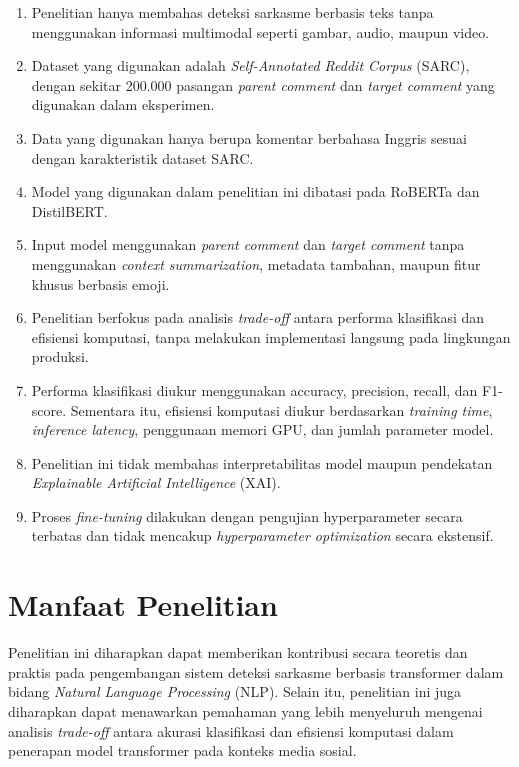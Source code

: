 \begin{enumerate}
    \item Penelitian hanya membahas deteksi sarkasme berbasis teks tanpa menggunakan informasi multimodal seperti gambar, audio, maupun video.
    \item Dataset yang digunakan adalah \textit{Self-Annotated Reddit Corpus} (SARC), dengan sekitar 200.000 pasangan \textit{parent comment} dan \textit{target comment} yang digunakan dalam eksperimen.
    \item Data yang digunakan hanya berupa komentar berbahasa Inggris sesuai dengan karakteristik dataset SARC.
    \item Model yang digunakan dalam penelitian ini dibatasi pada RoBERTa dan DistilBERT.
    \item Input model menggunakan \textit{parent comment} dan \textit{target comment} tanpa menggunakan \textit{context summarization}, metadata tambahan, maupun fitur khusus berbasis emoji.
    \item Penelitian berfokus pada analisis \textit{trade-off} antara performa klasifikasi dan efisiensi komputasi, tanpa melakukan implementasi langsung pada lingkungan produksi.
    \item Performa klasifikasi diukur menggunakan accuracy, precision, recall, dan F1-score. Sementara itu, efisiensi komputasi diukur berdasarkan \textit{training time}, \textit{inference latency}, penggunaan memori GPU, dan jumlah parameter model.
    \item Penelitian ini tidak membahas interpretabilitas model maupun pendekatan \textit{Explainable Artificial Intelligence} (XAI).
    \item Proses \textit{fine-tuning} dilakukan dengan pengujian hyperparameter secara terbatas dan tidak mencakup \textit{hyperparameter optimization} secara ekstensif.
\end{enumerate}


\section{Manfaat Penelitian}

Penelitian ini diharapkan dapat memberikan kontribusi secara teoretis dan praktis pada pengembangan sistem deteksi sarkasme berbasis transformer dalam bidang \textit{Natural Language Processing} (NLP). Selain itu, penelitian ini juga diharapkan dapat menawarkan pemahaman yang lebih menyeluruh mengenai analisis \textit{trade-off} antara akurasi klasifikasi dan efisiensi komputasi dalam penerapan model transformer pada konteks media sosial.

